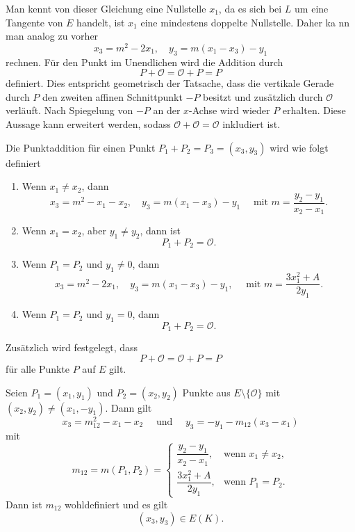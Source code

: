 Man kennt von dieser Gleichung eine Nullstelle $x_1$, da es sich bei $L$ um eine Tangente von $E$ handelt, ist $x_1$ eine mindestens doppelte Nullstelle. Daher ka nn man analog zu vorher
\[
    x_3=m^2-2x_1,\quad y_3=m(x_1-x_3)-y_1
\]
rechnen. Für den Punkt im Unendlichen wird die Addition durch
\[
    P+\mathcal{O}=\mathcal{O}+P=P
\]
definiert. Dies entspricht geometrisch der Tatsache, dass die vertikale
Gerade durch $P$ den zweiten affinen Schnittpunkt $-P$ besitzt und
zusätzlich durch $\mathcal{O}$ verläuft. Nach Spiegelung von $-P$
an der $x$-Achse wird wieder $P$ erhalten. Diese Aussage kann erweitert werden, sodass \(\mathcal{O}+\mathcal{O}=\mathcal{O}\) inkludiert ist.
\begin{definition}[Punktaddition]\label{def:punktaddition}
    Die Punktaddition für einen Punkt $P_1+P_2=P_3=(x_3,y_3)$ wird wie folgt definiert
    \begin{enumerate}
        \item Wenn $x_1\neq x_2$, dann
              \[x_3=m^2-x_1-x_2, \quad y_3=m(x_1-x_3)-y_1 \quad \text{ mit  } m=\frac{y_2-y_1}{x_2-x_1}.\]
        \item Wenn $x_1=x_2$, aber $y_1\neq y_2$, dann ist
              \[P_1+P_2=\mathcal{O}.\]
        \item Wenn $P_1=P_2$ und $y_1\neq 0$, dann
              \[x_3=m^2-2x_1, \quad y_3=m(x_1-x_3)-y_1, \quad \text{ mit } m=\frac{3x_1^2+A}{2y_1}.\]
        \item Wenn $P_1=P_2$ und $y_1=0$, dann
              \[P_1+P_2=\mathcal{O}.\]
    \end{enumerate}
    Zusätzlich wird festgelegt, dass
    \[
        P+\mathcal{O}=\mathcal{O}+P=P
    \]
    für alle Punkte $P$ auf $E$ gilt.
\end{definition}

\begin{lemma}\label{lem:wohldefiniertheit}
    Seien \(P_1=(x_1,y_1)\) und \(P_2=(x_2,y_2)\) Punkte aus $E\setminus \{\mathcal{O}\}$ mit \((x_2,y_2)\neq (x_1,-y_1)\). Dann gilt
    \[
        x_3 = m_{12}^2-x_1-x_2 \quad \text{ und } \quad y_3=-y_1-m_{12}(x_3-x_1)
    \]
    mit
    \[
        m_{12}=m(P_1,P_2)=
        \begin{cases}
            \dfrac{y_2-y_1}{x_2-x_1}, & \text{wenn } x_1 \neq x_2, \\[6pt]
            \dfrac{3x_1^2+A}{2y_1},   & \text{wenn } P_1=P_2.
        \end{cases}
    \]
    Dann ist \(m_{12}\) wohldefiniert und es gilt
    \[
        (x_3,y_3)\in E(K).
    \]
\end{lemma}

